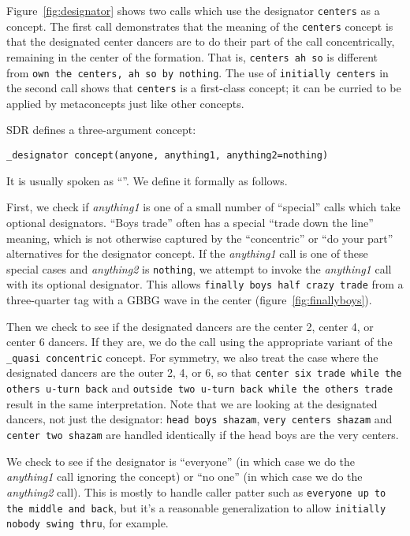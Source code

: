\documentclass[12pt]{article}
\renewcommand{\call}[1]{\texttt{#1}} %
\begin{document}
Figure~\ref{fig:designator} shows two calls which use the designator
\call{centers} as a concept.  The first call demonstrates that the
meaning of the \call{centers} concept is that the designated center
dancers are to do their part of the call concentrically, remaining in
the center of the formation.  That is, \call{centers ah so} is
different from \call{own the centers, ah so by nothing}.  The use of
\call{initially centers} in the second call shows that \call{centers}
is a first-class concept; it can be curried to be applied by
metaconcepts just like other concepts.

SDR defines a three-argument concept:
\begin{lstlisting}
_designator concept(anyone, anything1, anything2=nothing)
\end{lstlisting}
It is usually spoken as
``''.
We define it formally as follows.

First, we check if \textit{anything1} is one of a small number of ``special''
calls which take optional designators.  ``Boys trade'' often has a
special ``trade down the line'' meaning, which is not otherwise
captured by the ``concentric'' or ``do your part'' alternatives for
the designator concept.  If the \textit{anything1} call is one of these
special cases and \textit{anything2} is \call{nothing}, we attempt to
invoke the \textit{anything1} call with its optional
designator.  This allows \call{finally boys half crazy trade} from a
three-quarter tag with a GBBG wave in the center (figure~\ref{fig:finallyboys}).

Then we check to see if the designated dancers are the center 2,
center 4, or center 6 dancers.  If they are, we do the call using the
appropriate variant of the \call{\_quasi concentric} concept.  For
symmetry, we also treat the case where the designated dancers are the
outer 2, 4, or 6, so that \call{center six trade while the
  others u-turn back} and \call{outside two u-turn back while the
  others trade} result in the same interpretation.  Note that we are
looking at the designated dancers, not just the designator: \call{head
  boys shazam}, \call{very centers shazam} and \call{center two
  shazam} are handled identically if the head boys are the very centers.

We check to see if the designator is ``everyone'' (in which case we do
the \textit{anything1} call ignoring the concept) or ``no one'' (in
which case we do the \textit{anything2} call).
This is mostly to handle caller patter such as \call{everyone
up to the middle and back}, but it's a reasonable generalization to
allow \call{initially nobody swing thru}, for example.
\end{document}
